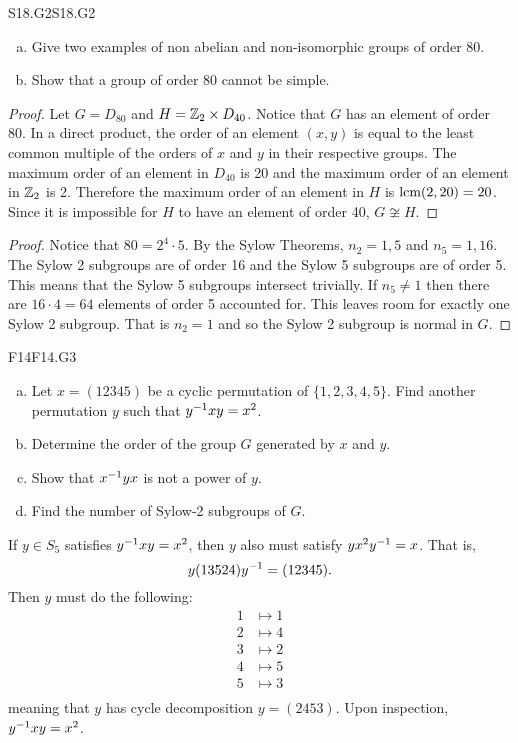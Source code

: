 \documentclass[../AlgebraQualSolutions.tex]{subfiles}
\begin{document}
	\begin{prob}{S18.G2}{S18.G2}
		\begin{enumerate}[(a)]
			\item Give two examples of non abelian and non-isomorphic groups of order 80.
			\item Show that a group of order 80 cannot be simple.
		\end{enumerate}
	\end{prob}

	\begin{proof}
		Let $G = D_{80}$ and $H = \mathbb{Z}_2 \times D_{40}$. Notice that $G$ has an element of order 80. In a direct product, the order of an element $(x,y)$ is equal to the least common multiple of the orders of $x$ and $y$ in their respective groups. The maximum order of an element in $D_{40}$ is 20 and the maximum order of an element in $\mathbb{Z}_2$ is 2. Therefore the maximum order of an element in $H$ is $\textrm{lcm}(2,20) = 20$. Since it is impossible for $H$ to have an element of order 40, $G \not\cong H$.
	\end{proof}

	\begin{proof}
		Notice that $80 = 2^4 \cdot 5$. By the Sylow Theorems, $n_2 = 1, 5$ and $n_5 = 1,16$. The Sylow 2 subgroups are of order 16 and the Sylow 5 subgroups are of order 5. This means that the Sylow 5 subgroups intersect trivially. If $n_5 \neq 1$ then there are $16 \cdot 4 = 64$ elements of order 5 accounted for. This leaves room for exactly one Sylow 2 subgroup. That is $n_2 = 1$ and so the Sylow 2 subgroup is normal in $G$.
	\end{proof}

	\begin{prob}{F14}{F14.G3}
		\begin{enumerate}[(a)]
			\item Let $x = (12345)$ be a cyclic permutation of $\{1,2,3,4,5\}$. Find another permutation $y$ such that $y^{-1} xy = x^2$.
			\item Determine the order of the group $G$ generated by $x$ and $y$.
			\item Show that $x^{-1} y x$ is not a power of $y$.
			\item Find the number of Sylow-2 subgroups of $G$.
		\end{enumerate}
	\end{prob}

	\begin{solution}
		If $y \in S_5$ satisfies  $y^{-1} xy = x^2$, then $y$ also must satisfy $yx^2y^{-1} = x$. That is,
			\[y(13524)y^{-1} = (12345).\]
		Then $y$ must do the following:
			\begin{align*}
				1 &\mapsto 1\\
				2 &\mapsto 4\\
				3 &\mapsto 2\\
				4 &\mapsto 5\\
				5 &\mapsto 3\\
			\end{align*}
		meaning that $y$ has cycle decomposition $y = (2453)$. Upon inspection, $y^{-1} x y = x^2$.
	\end{solution}
\end{document}
